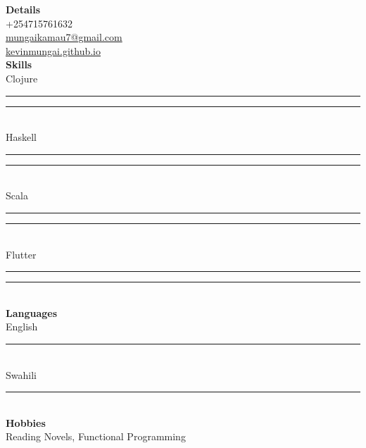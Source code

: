 \documentclass[11pt,a4paper]{article}
\begin{document}
\hspace{0.5cm}
\begin{minipage}[t]{0.3\textwidth}
  \vspace{2.75cm}
  {\large \textbf{Details}}\\[0.3cm]
  +254715761632\\
  \href{mailto:mungaikamau7@gmail.com}{mungaikamau7@gmail.com}\\
  \href{https://kevinmungai.github.io/}{kevinmungai.github.io}\\[1cm]
  {\large \textbf{Skills}}\\[0.3cm]
  {\large Clojure}\\
  \noindent\textcolor{blue!50}{\rule{3cm}{0.5mm}}\textcolor{gray!20}{\rule{3cm}{0.5mm}}\\[0.5cm]
  {\large Haskell}\\
  \noindent\textcolor{blue!50}{\rule{2cm}{0.5mm}}\textcolor{gray!20}{\rule{4cm}{0.5mm}}\\[0.5cm]
  {\large Scala}\\
  \noindent\textcolor{blue!50}{\rule{2cm}{0.5mm}}\textcolor{gray!20}{\rule{4cm}{0.5mm}}\\[0.5cm]
  {\large Flutter}\\
  \noindent\textcolor{blue!50}{\rule{1cm}{0.5mm}}\textcolor{gray!20}{\rule{5cm}{0.5mm}}\\[1cm]
  {\large \textbf{Languages}}\\[0.3cm]
  {\large English}\\
  \noindent\textcolor{blue!50}{\rule{6cm}{0.5mm}}\\[0.5cm]
  {\large Swahili}\\
  \noindent\textcolor{blue!50}{\rule{6cm}{0.5mm}}\\[1cm]
  {\large \textbf{Hobbies}}\\[0.3cm]
  Reading Novels, Functional Programming
\end{minipage}


\end{document}
